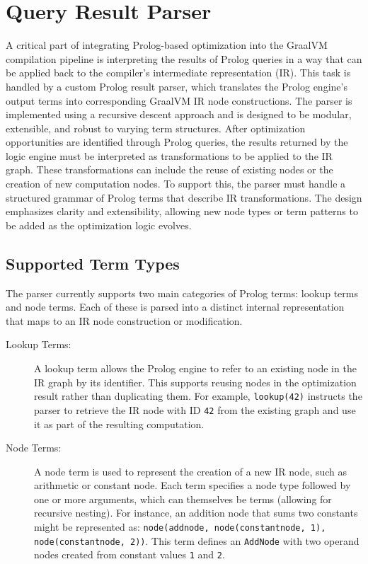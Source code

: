 \section{Query Result Parser}
A critical part of integrating Prolog-based optimization into the GraalVM compilation pipeline is interpreting the results of Prolog queries in a way that can be applied back to the compiler’s intermediate representation (IR). This task is handled by a custom Prolog result parser, which translates the Prolog engine’s output terms into corresponding GraalVM IR node constructions. The parser is implemented using a recursive descent approach and is designed to be modular, extensible, and robust to varying term structures. After optimization opportunities are identified through Prolog queries, the results returned by the logic engine must be interpreted as transformations to be applied to the IR graph. These transformations can include the reuse of existing nodes or the creation of new computation nodes. To support this, the parser must handle a structured grammar of Prolog terms that describe IR transformations. The design emphasizes clarity and extensibility, allowing new node types or term patterns to be added as the optimization logic evolves.

\subsection{Supported Term Types}

The parser currently supports two main categories of Prolog terms: lookup terms and node terms.
Each of these is parsed into a distinct internal representation that maps to an IR node construction or modification.

\begin{description}
    \item[Lookup Terms:] A lookup term allows the Prolog engine to refer to an existing node in the IR graph by its identifier. This supports reusing nodes in the optimization result rather than duplicating them. For example, \texttt{lookup(42)} instructs the parser to retrieve the IR node with ID \texttt{42} from the existing graph and use it as part of the resulting computation.
    \item[Node Terms:] A node term is used to represent the creation of a new IR node, such as arithmetic or constant node. Each term specifies a node type followed by one or more arguments, which can themselves be terms (allowing for recursive nesting). For instance, an addition node that sums two constants might be represented as: \texttt{node(addnode, node(constantnode, 1), node(constantnode, 2))}. This term defines an \texttt{AddNode} with two operand nodes created from constant values \texttt{1} and \texttt{2}.
\end{description}

